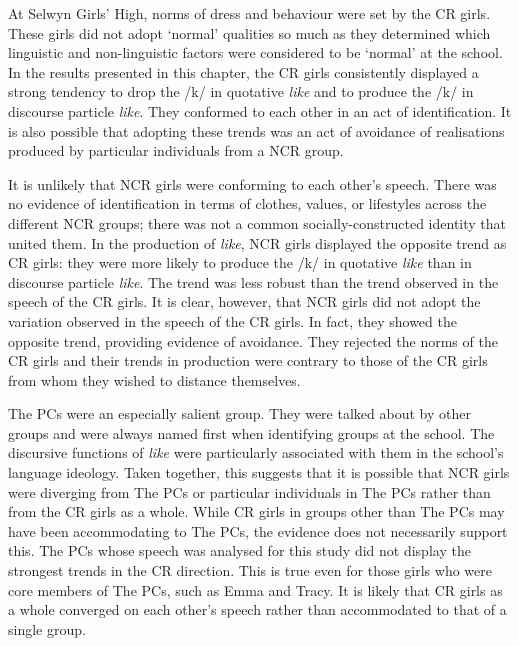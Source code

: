 At Selwyn Girls' High, norms of dress and behaviour were set by the CR girls. These girls did not adopt `normal' qualities so much as they determined which linguistic and non-linguistic factors were considered to be `normal' at the school. In the results presented in this chapter, the CR girls consistently displayed a strong tendency to drop the /k/ in quotative \textit{like} and to produce the /k/ in discourse particle \textit{like}. They conformed to each other in an act of identification. It is also possible that adopting these trends was an act of avoidance of realisations produced by particular individuals from a NCR group.

It is unlikely that NCR girls were conforming to each other's speech. There was no evidence of identification in terms of clothes, values, or life\-styles across the different NCR groups; there was not a common so\-cially-con\-structed identity that united them. In the production of \textit{like}, NCR girls displayed the opposite trend as CR girls: they were more likely to produce the /k/ in quotative \textit{like} than in discourse particle \textit{like}. The trend was less robust than the trend observed in the speech of the CR girls. It is clear, however, that NCR girls did not adopt the variation observed in the speech of the CR girls. In fact, they showed the opposite trend, providing evidence of avoidance. They rejected the norms of the CR girls and their trends in production were contrary to those of the CR girls from whom they wished to distance themselves. 

The PCs were an especially salient group. They were talked about by other groups and were always named first when identifying groups at the school. The discursive functions of \textit{like} were particularly associated with them in the school's language ideology. Taken together, this suggests that it is possible that NCR girls were diverging from The PCs or particular individuals in The PCs rather than from the CR girls as a whole. While CR girls in groups other than The PCs may have been accommodating to The PCs, the evidence does not necessarily support this. The PCs whose speech was analysed for this study did not display the strongest trends in the CR direction. This is true even for those girls who were core members of The PCs, such as Emma and Tracy. It is likely that CR girls as a whole converged on each other's speech rather than accommodated to that of a single group.

